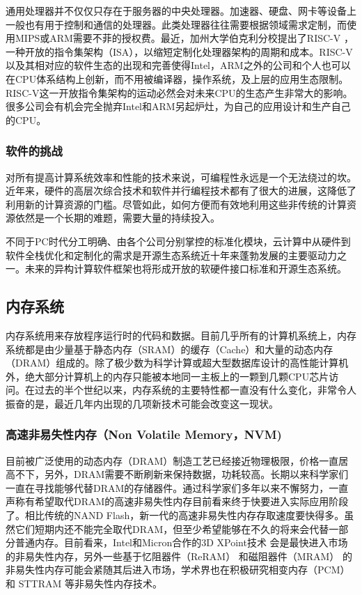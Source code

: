 通用处理器并不仅仅只存在于服务器的中央处理器。加速器、硬盘、网卡等设备上一般也有用于控制和通信的处理器。此类处理器往往需要根据领域需求定制，而使用MIPS或ARM需要不菲的授权费。最近，加州大学伯克利分校提出了RISC-V \cite{asanovic2014instruction}，一种开放的指令集架构（ISA），以缩短定制化处理器架构的周期和成本。RISC-V以及其相对应的软件生态的出现和完善使得Intel，ARM之外的公司和个人也可以在CPU体系结构上创新，而不用被编译器，操作系统，及上层的应用生态限制。RISC-V这一开放指令集架构的运动必然会对未来CPU的生态产生非常大的影响。很多公司会有机会完全抛弃Intel和ARM另起炉灶，为自己的应用设计和生产自己的CPU。

\subsubsection{软件的挑战}

对所有提高计算系统效率和性能的技术来说，可编程性永远是一个无法绕过的坎。近年来，硬件的高层次综合技术和软件并行编程技术都有了很大的进展，这降低了利用新的计算资源的门槛。尽管如此，如何方便而有效地利用这些非传统的计算资源依然是一个长期的难题，需要大量的持续投入。

不同于PC时代分工明确、由各个公司分别掌控的标准化模块，云计算中从硬件到软件全栈优化和定制化的需求是开源生态系统近十年来蓬勃发展的主要驱动力之一。未来的异构计算软件框架也将形成开放的软硬件接口标准和开源生态系统。

\subsection{内存系统}

内存系统用来存放程序运行时的代码和数据。目前几乎所有的计算机系统上，内存系统都是由少量基于静态内存（SRAM）的缓存（Cache）和大量的动态内存（DRAM）组成的。除了极少数为科学计算或超大型数据库设计的高性能计算机外，绝大部分计算机上的内存只能被本地同一主板上的一颗到几颗CPU芯片访问。在过去的半个世纪以来，内存系统的主要特性都一直没有什么变化，非常令人振奋的是，最近几年内出现的几项新技术可能会改变这一现状。

\subsubsection{高速非易失性内存（Non Volatile Memory，NVM)}

目前被广泛使用的动态内存（DRAM）制造工艺已经接近物理极限，价格一直居高不下，另外，DRAM需要不断刷新来保持数据，功耗较高。长期以来科学家们一直在寻找能够代替DRAM的存储器件。通过科学家们多年以来不懈努力，一直声称有希望取代DRAM的高速非易失性内存目前看来终于快要进入实际应用阶段了。相比传统的NAND Flash，新一代的高速非易失性内存存取速度要快得多。虽然它们短期内还不能完全取代DRAM，但至少希望能够在不久的将来会代替一部分普通内存。目前看来，Intel和Micron合作的3D XPoint技术 \cite{3d-xpoint} 会是最快进入市场的非易失性内存，另外一些基于忆阻器件（ReRAM） \cite{akinaga2010resistive} 和磁阻器件（MRAM） \cite{tehrani1999progress} 的非易失性内存可能会紧随其后进入市场，学术界也在积极研究相变内存（PCM） \cite{raoux2008phase,lee2010phase} 和 STTRAM \cite{kultursay2013evaluating,apalkov2013spin} 等非易失性内存技术。

